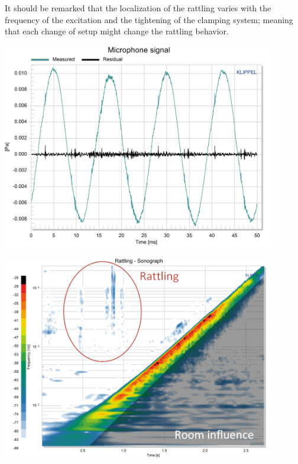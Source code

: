 \documentclass{report}
\begin{document}
It should be remarked that the localization of the rattling varies with the frequency of the excitation and the tightening of the clamping system; meaning that each change of setup might change the rattling behavior. 

\begin{minipage}{0.5\textwidth}
\begin{center}
	\includegraphics[width=0.9\textwidth]{GridOpti/Baffle_Rattle} 
    \captionsetup{hypcap=false} 
	\label{fig:sweep_baffle}
\end{center}
\end{minipage}
\begin{minipage}{0.5\textwidth}
\begin{center}
	\includegraphics[width=0.9\textwidth]{GridOpti/Baffle_Rattle_Sono} 
    \captionsetup{hypcap=false} 
	\label{fig:sweep_baffle_sono}
\end{center}
\end{minipage}
\end{document}

